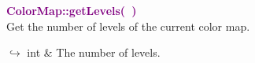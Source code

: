 
\textcolor{purple}{\textbf{ColorMap::getLevels(~)}}\label{ColorMap::getLevels()}\\
Get the number of levels of the current color map.\vspace*{-0.5em}
\begin{tcolorbox}[grow to left by=-1cm, width=\textwidth-1cm,myArgs,tabularx={l|R}]
$\hookrightarrow$ int & The number of levels.
\end{tcolorbox}



